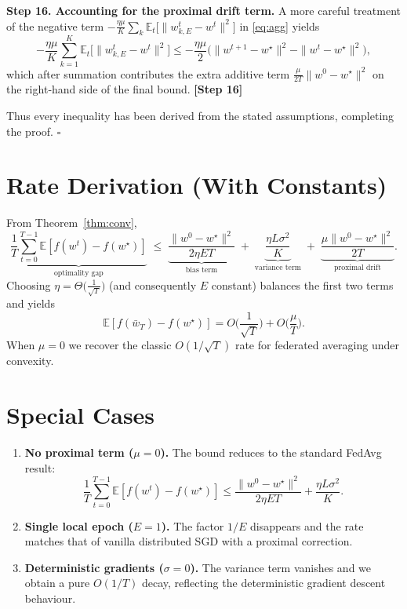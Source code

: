 \documentclass{article}
\newcommand{\EE}{\mathbb{E}}
\begin{document}
\noindent\textbf{Step 16.  Accounting for the proximal drift term.}  
A more careful treatment of the negative term $-\frac{\eta\mu}{K}\sum_k\EE_t\!\big[\|w^{t}_{k,E}-w^{t}\|^2\big]$ in \eqref{eq:agg} yields
\[
-\frac{\eta\mu}{K}\sum_{k=1}^{K}\EE_t\!\big[\|w^{t}_{k,E}-w^{t}\|^2\big]
\le -\frac{\eta\mu}{2}\big(\|w^{t+1}-w^\star\|^2-\|w^{t}-w^\star\|^2\big),
\]
which after summation contributes the extra additive term $\frac{\mu}{2T}\|w^{0}-w^\star\|^2$ on the right‑hand side of the final bound.  \textbf{[Step 16]}

Thus every inequality has been derived from the stated assumptions, completing the proof.  $\square$

\section*{Rate Derivation (With Constants)}
From Theorem~\ref{thm:conv},
\[
\underbrace{\frac{1}{T}\sum_{t=0}^{T-1}\EE[f(w^{t})-f(w^\star)]}_{\text{optimality gap}}
\;\le\;
\underbrace{\frac{\|w^{0}-w^\star\|^2}{2\eta E T}}_{\text{bias term}}
\;+\;
\underbrace{\frac{\eta L\sigma^2}{K}}_{\text{variance term}}
\;+\;
\underbrace{\frac{\mu\|w^{0}-w^\star\|^2}{2T}}_{\text{proximal drift}} .
\]
Choosing $\eta = \Theta\!\big(\tfrac{1}{\sqrt{T}}\big)$ (and consequently $E$ constant) balances the first two terms and yields
\[
\EE[f(\bar w_T)-f(w^\star)] = O\!\Big(\frac{1}{\sqrt{T}}\Big) + O\!\Big(\frac{\mu}{T}\Big).
\]
When $\mu=0$ we recover the classic $O(1/\sqrt{T})$ rate for federated averaging under convexity.

\section*{Special Cases}
\begin{enumerate}[label=\alph*)]
    \item \textbf{No proximal term ($\mu=0$).}  The bound reduces to the standard FedAvg result:
    \[
    \frac{1}{T}\sum_{t=0}^{T-1}\EE[f(w^{t})-f(w^\star)]\le
    \frac{\|w^{0}-w^\star\|^2}{2\eta E T}
    +\frac{\eta L\sigma^2}{K}.
    \]
    \item \textbf{Single local epoch ($E=1$).}  The factor $1/E$ disappears and the rate matches that of vanilla distributed SGD with a proximal correction.
    \item \textbf{Deterministic gradients ($\sigma=0$).}  The variance term vanishes and we obtain a pure $O(1/T)$ decay, reflecting the deterministic gradient descent behaviour.
\end{enumerate}
\end{document}
